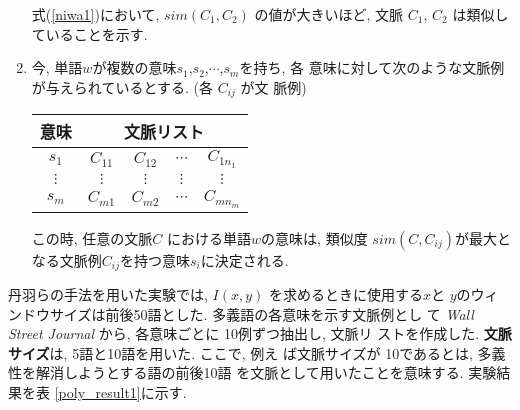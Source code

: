 \begin{enumerate}
式(\ref{niwa1})において, $sim(C_{1}, C_{2})$ の値が大きいほど, 文脈 
$C_{1}$, $C_{2}$ は類似していることを示す.

\item 今, 単語$w$\hspace{-0.01mm}が複数の意味\hspace{-0.01mm}$s_{1}$,$s_{2}$,$\cdots$,$s_{m}$\hspace{-0.25mm}を持ち,  \hspace{-0.1mm}各
意味に対して次のような文脈例が与えられているとする. (各 $C_{ij}$ が文
脈例)

{
\begin{center}
\begin{tabular}{ccccc}
意味 &\multicolumn{4}{c}{文脈リスト} \\ \hline
$s_{1}$ &$C_{11}$ &$C_{12}$ &$\cdots$ &$C_{1n_{1}}$ \\
$\vdots$ &$\vdots$ &$\vdots$ &$\vdots$ &$\vdots$ \\
$s_{m}$ &$C_{m1}$ &$C_{m2}$ &$\cdots$ &$C_{mn_{m}}$ \\
\end{tabular}
\end{center}
}

この時, 任意の文脈$C$ における単語$w$の意味は, 類似度
$sim(C,C_{ij})$が最大となる文脈例$C_{ij}$を持つ意味$s_{i}$に決定される.

 
\end{enumerate}

丹羽らの手法を用いた実験では, $I(x,y)$ を求めるときに使用する$x$と
$y$のウィンドウサイズは前後50語とした.  多義語の各意味を示す文脈例とし
て {\it Wall Street Journal} から, 各意味ごとに 10例ずつ抽出し, 文脈リ
ストを作成した.  {\bf 文脈サイズ}は, 5語と10語を用いた. ここで, 例え
ば文脈サイズが \hspace{-0.05mm}10\hspace{-0.05mm}であるとは, \hspace{-0.05mm}多義性を解消しようとする語の前後10語
を文脈として用いたことを意味する.  実験結果を表
\ref{poly_result1}に示す.




